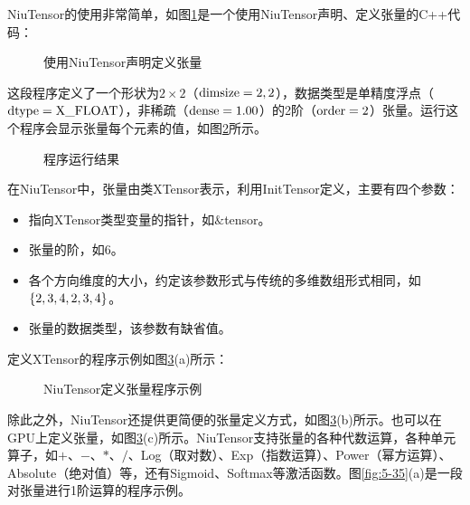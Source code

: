 \parinterval NiuTensor的使用非常简单，如图\ref{fig:5-30}是一个使用NiuTensor声明、定义张量的C++代码：

\begin{figure}[htp]
\centering

\caption{使用NiuTensor声明定义张量}
\label{fig:5-30}
\end{figure}

\parinterval 这段程序定义了一个形状为$ 2\times 2 $（${\rm{dimsize}}=2,2 $），数据类型是单精度浮点（$ \rm{dtype=X\_FLOAT} $），非稀疏（$ \rm{dense}=1.00 $）的2阶（$ \rm{order}=2 $）张量。运行这个程序会显示张量每个元素的值，如图\ref{fig:5-31}所示。

\begin{figure}[htp]
\centering

\caption{程序运行结果}
\label{fig:5-31}
\end{figure}

\parinterval 在NiuTensor中，张量由类XTensor表示，利用InitTensor定义，主要有四个参数：

\begin{itemize}
\vspace{0.5em}
\item 指向XTensor类型变量的指针，如$ \& $tensor。
\vspace{0.5em}
\item 张量的阶，如6。
\vspace{0.5em}
\item 各个方向维度的大小，约定该参数形式与传统的多维数组形式相同，如$ \{2,3,4,\\2,3,4\} $。
\vspace{0.5em}
\item 张量的数据类型，该参数有缺省值。
\vspace{0.5em}
\end{itemize}

\parinterval 定义XTensor的程序示例如图\ref{fig:5-32}(a)所示：

\begin{figure}[htp]
\centering

\caption{ NiuTensor定义张量程序示例}
\label{fig:5-32}
\end{figure}

\parinterval 除此之外，NiuTensor还提供更简便的张量定义方式，如图\ref{fig:5-32}(b)所示。也可以在GPU上定义张量，如图\ref{fig:5-32}(c)所示。NiuTensor支持张量的各种代数运算，各种单元算子，如$ + $、$ - $、$ \ast $、$ / $、Log（取对数）、Exp（指数运算）、Power（幂方运算）、Absolute（绝对值）等，还有Sigmoid、Softmax等激活函数。图\ref{fig:5-35}(a)是一段对张量进行1阶运算的程序示例。

